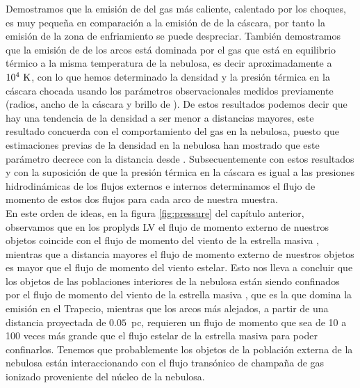 Demostramos que la emisión de \ha{} del gas más caliente, calentado por los choques, es muy pequeña en comparación a la emisión de \ha{} de la cáscara, por tanto la emisión de la zona de enfriamiento se puede despreciar. También demostramos que la emisión de \ha{} de los arcos está dominada por el gas que está en equilibrio térmico a la misma temperatura de la nebulosa, es decir aproximadamente a \(10^{4}~\mathrm{K}\), con lo que hemos determinado la densidad y la presión térmica en la cáscara chocada usando los parámetros observacionales medidos previamente (radios, ancho de la cáscara y brillo de \ha{}). De estos resultados podemos decir que hay una tendencia de la densidad a ser menor a distancias mayores, este resultado concuerda con el comportamiento del gas en la nebulosa, puesto que estimaciones previas de la densidad en la nebulosa han mostrado que este parámetro decrece con la  distancia desde \thC{} \citep{Odell:2010, Mesa:2008}. Subsecuentemente con estos resultados y con la suposición de que la presión térmica en la cáscara es igual a las presiones hidrodinámicas de los flujos externos e internos determinamos el flujo de momento de estos dos flujos para cada arco de nuestra muestra.\\
  
En este orden de ideas, en la figura \ref{fig:pressure} del capítulo anterior, observamos que en los proplyds LV el flujo de momento externo de nuestros objetos coincide con el flujo de momento del viento de la estrella masiva \thC{}, mientras que a distancia mayores el flujo de momento externo de nuestros objetos es mayor que el flujo de momento del viento estelar. Esto nos lleva a concluir que los objetos de las poblaciones interiores de la nebulosa están siendo confinados por el flujo de momento del viento de la estrella masiva \thC{}, que es la que domina la emisión en el Trapecio, mientras que los arcos más alejados, a partir de una distancia proyectada de \(0.05\)~pc, requieren un flujo de momento que sea de 10 a 100 veces más grande que el flujo estelar de la estrella masiva para poder confinarlos. Tenemos que probablemente los objetos de la población externa de la nebulosa están interaccionando con el flujo transónico de champaña de gas ionizado proveniente del núcleo de la nebulosa.\\ 

